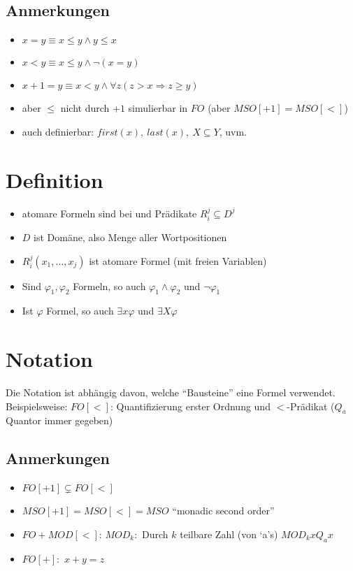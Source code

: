     \subsection{Anmerkungen}
        \begin{itemize}
            \item $x=y\equiv x\le y\wedge y\le x$
            \item $x<y\equiv x\le y\wedge \neg(x=y)$
            \item $x+1=y\equiv x<y\wedge\forall z(z>x\Rightarrow z\geq y)$
            \item aber $\leq$ nicht durch $+1$ simulierbar in $FO$ (aber $MSO[+1]=MSO[<]$)
            \item auch definierbar: $first(x),\ last(x),\ X\subseteq Y$, uvm.
        \end{itemize}
\section{Definition}
    \begin{itemize}
        \item atomare Formeln sind bei und Prädikate $R_i^j\subseteq D^j$
        \item $D$ ist Domäne, also Menge aller Wortpositionen
        \item $R_i^j(x_1,\dots,x_j)$ ist atomare Formel (mit freien Variablen)
        \item Sind $\varphi_1,\varphi_2$ Formeln, so auch $\varphi_1\wedge\varphi_2$ und $\neg \varphi_1$
        \item Ist $\varphi$ Formel, so auch $\exists x\varphi$ und $\exists X\varphi$
    \end{itemize}
\section{Notation}
    Die Notation ist abhängig davon, welche ``Bausteine'' eine Formel verwendet. Beispielsweise:
    $FO[<]$: Quantifizierung erster Ordnung und $<$-Prädikat ($Q_a$ Quantor immer gegeben)\\
    \subsection{Anmerkungen}
        \begin{itemize}
            \item $FO[+1]\subsetneq FO[<]$
            \item $MSO[+1]=MSO[<]=MSO$ ``monadic second order''
            \item $FO+MOD[<]$: $MOD_k:$ Durch $k$ teilbare Zahl (von `a's) $MOD_kxQ_ax$
            \item $FO[+]:$ $x+y=z$
        \end{itemize}

